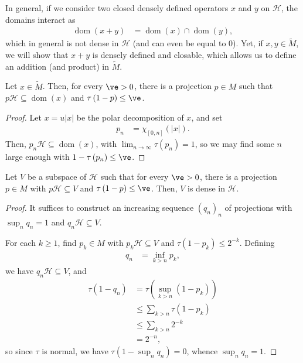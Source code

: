 \documentclass[10pt]{mypackage}
\begin{document}
In general, if we consider two closed densely defined operators $x$ and $y$ on $\mathcal{H}$, the domains interact as
\begin{align*}
  \operatorname{dom}\left( x+y \right) &= \operatorname{dom}\left( x \right)\cap \operatorname{dom}\left( y \right),
\end{align*}
which in general is not dense in $\mathcal{H}$ (and can even be equal to $0$). Yet, if $x,y\in \widetilde{M}$, we will show that $x+y$ is densely defined and closable, which allows us to define an addition (and product) in $\widetilde{M}$.
\begin{lemma}
  Let $x\in \widetilde{M}$. Then, for every $\ve > 0$, there is a projection $p\in M$ such that $ p\mathcal{H}\subseteq \operatorname{dom}\left( x \right) $ and $\tau\left( 1-p \right)\leq \ve$.
\end{lemma}
\begin{proof}
  Let $x = u\left\vert x \right\vert$ be the polar decomposition of $x$, and set
  \begin{align*}
    p_n &= \chi_{[0,n]} \left( \left\vert x \right\vert \right).
  \end{align*}
  Then, $p_n\mathcal{H}\subseteq \operatorname{dom}\left( x \right)$, with $\lim_{n\rightarrow\infty}\tau\left( p_n \right) = 1$, so we may find some $n$ large enough with $1-\tau\left( p_n \right)\leq \ve$.
\end{proof}
\begin{lemma}
  Let $V$ be a subspace of $\mathcal{H}$ such that for every $\ve > 0$, there is a projection $p\in M$ with $p\mathcal{H}\subseteq V$ and $\tau\left( 1-p \right) \leq \ve$. Then, $V$ is dense in $\mathcal{H}$.
\end{lemma}
\begin{proof}
  It suffices to construct an increasing sequence $\left( q_n \right)_n$ of projections with $\sup_{n}q_n = 1$ and $q_n\mathcal{H}\subseteq V$.

  For each $k\geq 1$, find $p_k\in M$ with $p_k\mathcal{H}\subseteq V$ and $\tau\left( 1-p_k \right)\leq 2^{-k}$. Defining
  \begin{align*}
    q_n &= \inf_{k > n} p_k,
  \end{align*}
  we have $q_n\mathcal{H}\subseteq V$, and
  \begin{align*}
    \tau\left( 1-q_n \right) &= \tau\left( \sup_{k > n}\left( 1-p_k \right) \right)\\
                             &\leq \sum_{k > n} \tau\left( 1-p_k \right)\\
                             &\leq \sum_{k > n} 2^{-k}\\
                             &= 2^{-n},
  \end{align*}
  so since $\tau$ is normal, we have $\tau\left( 1-\sup_n q_n\right) = 0$, whence $\sup_{n}q_n = 1$.
\end{proof}
\end{document}

